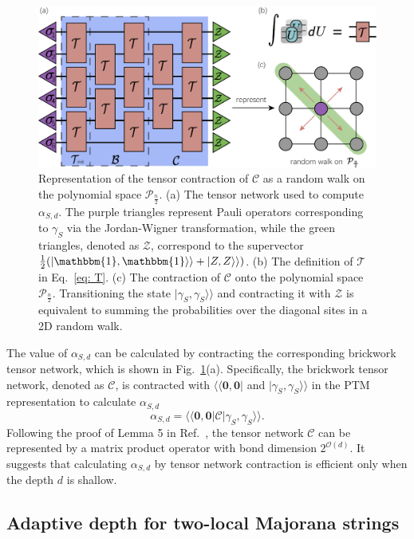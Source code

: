 \documentclass[showpacs,onecolumn,aps,prx,long bibliography,superscriptaddress,notitlepage]{revtex4-1}
\newcommand{\supket}[1]{|#1 \rangle\rangle}
\newcommand{\supbra}[1]{\langle\langle #1 |}
\newcommand{\Tcal}{\mathcal{T}}
\begin{document}
\begin{figure}
    \centering
    \includegraphics[width=0.8 \linewidth]{figures/main/figure4_v3.pdf}
    \caption{\centering Representation of the tensor contraction of $\mathcal{C}$ as a random walk on the polynomial space $\mathcal{P}_{\frac{n}{2}}$. (a) The tensor network used to compute $\alpha_{S,d}$. The purple triangles represent Pauli operators corresponding to $\gamma_S$ via the Jordan-Wigner transformation, while the green triangles, denoted as $\mathcal{Z}$, correspond to the supervector $\frac{1}{2} (\supket{\mathbbm{1}, \mathbbm{1}} + \supket{Z, Z})$. (b) The definition of $\Tcal$ in Eq.~\eqref{eq: T}. (c) The contraction of $\mathcal{C}$ onto the polynomial space $\mathcal{P}_{\frac{n}{2}}$. Transitioning the state $\supket{\gamma_S, \gamma_S}$ and contracting it with $\mathcal{Z}$ is equivalent to summing the probabilities over the diagonal sites in a 2D random walk.
    }
    \label{fig: figure4}
\end{figure}

The value of $\alpha_{S,d}$ can be calculated by contracting the corresponding brickwork tensor network, which is shown in Fig.~\ref{fig: figure4}(a). Specifically, the brickwork tensor network, denoted as $\mathcal{C}$, is contracted with $\supbra{\bm 0,\bm 0}$ and $\supket{\gamma_S, \gamma_S}$ in the PTM representation to calculate $\alpha_{S,d}$
\begin{equation}
    \alpha_{S,d} = \supbra{\bm 0,\bm 0} \mathcal{C}  \supket{\gamma_S, \gamma_S}.
    \label{eq: alpha Twhole}
\end{equation}
Following the proof of Lemma 5 in Ref.~\cite{bertoni2024shallow}, 
the tensor network $\mathcal{C}$ can be represented by a matrix product operator with bond dimension $2^{\mathcal{O}(d)}$. It suggests that calculating $\alpha_{S,d}$ by tensor network contraction is efficient only when the depth $d$ is shallow.





\subsection{Adaptive depth for two-local  Majorana strings}
\end{document}
